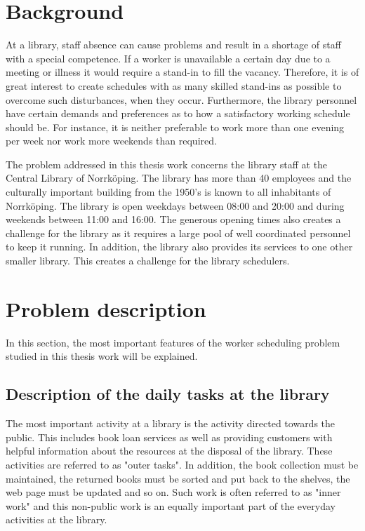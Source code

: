
\section{Background}


At a library, staff absence can cause problems and result in a shortage of staff with a special competence. If a worker is unavailable a certain day due to a meeting or illness it would require a stand-in to fill the vacancy. Therefore, it is of great interest to create schedules with as many skilled stand-ins as possible to overcome such disturbances, when they occur. Furthermore, the library personnel have certain demands and preferences as to how a satisfactory working schedule should be. For instance, it is neither preferable to work more than one evening per week nor work more weekends than required. 

The problem addressed in this thesis work concerns the library staff at the Central Library of Norrköping. The library has more than 40 employees and the culturally important building from the 1950's is known to all inhabitants of Norrköping. The library is open weekdays between 08:00 and 20:00 and during weekends between 11:00 and 16:00. The generous opening times also creates a challenge for the library as it requires a large pool of well coordinated personnel to keep it running. In addition, the library also provides its services to one other smaller library. This creates a challenge for the library schedulers.

\section{Problem description}

In this section, the most important features of the worker scheduling problem studied in this thesis work will be explained.  

\subsection{Description of the daily tasks at the library}
The most important activity at a library is the activity directed towards the public. This includes book loan services as well as providing customers with helpful information about the resources at the disposal of the library. These activities are referred to as "outer tasks". In addition, the book collection must be maintained, the returned books must be sorted and put back to the shelves, the web page must be updated and so on. Such work is often referred to as "inner work" and this non-public work is an equally important part of the everyday activities at the library. 

